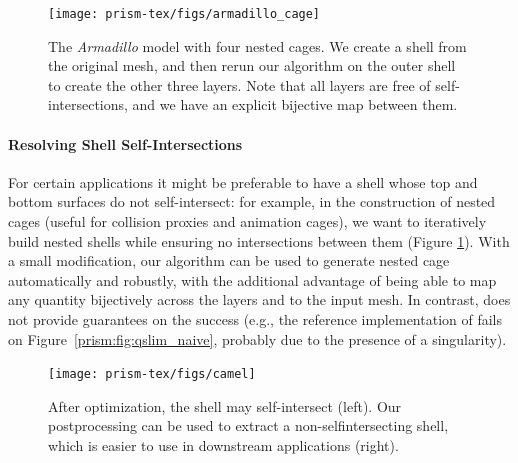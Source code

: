 \begin{figure}
    \centering
    \texttt{[image: prism-tex/figs/armadillo\_cage]}
    \caption{The \protect\emph{Armadillo} model with four nested cages. We create a shell from the original mesh, and then rerun our algorithm on the outer shell to create the other three layers. Note that all layers are free of self-intersections, and we have an explicit bijective map between them.}
    
    \label{prism:fig:nested-cages}
\end{figure}

\paragraph{Resolving Shell Self-Intersections}
\label{prism:sec:postprocessing}
For certain applications it might be preferable to have a shell whose  {top and bottom surfaces do} not self-intersect:
for example, in the construction of nested cages \cite{sacht2015nested} (useful for collision proxies and animation cages), we want to iteratively build nested shells while ensuring no intersections between them (Figure \ref{prism:fig:nested-cages}). 
With a small modification, our algorithm can be used to generate nested cage automatically and robustly, with the additional advantage of being able to map any quantity  bijectively across the layers and to the input mesh. In contrast, \cite{sacht2015nested}
does not provide guarantees on the success (e.g., the reference implementation of \cite{sacht2015nested} fails on Figure~\ref{prism:fig:qslim_naive}, probably due to the presence of a singularity). 
\begin{figure}
    \centering
    \texttt{[image: prism-tex/figs/camel]}
    \caption{After optimization, the shell may self-intersect (left). Our postprocessing can be used to extract a non-selfintersecting shell, which is easier to use in downstream applications (right).}
    \label{prism:fig:shell_shrinking-cages}
    
\end{figure}

